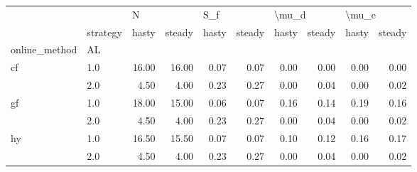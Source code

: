 \begin{tabular}{llrrrrrrrr}
\toprule
   & {} & \multicolumn{2}{l}{N} & \multicolumn{2}{l}{S\_f} & \multicolumn{2}{l}{\textbackslash mu\_d} & \multicolumn{2}{l}{\textbackslash mu\_e} \\
   & strategy & hasty & steady & hasty & steady & hasty & steady & hasty & steady \\
online\_method & AL &       &        &       &        &       &        &       &        \\
\midrule
cf & 1.0 & 16.00 &  16.00 &  0.07 &   0.07 &  0.00 &   0.00 &  0.00 &   0.00 \\
   & 2.0 &  4.50 &   4.00 &  0.23 &   0.27 &  0.00 &   0.04 &  0.00 &   0.02 \\
gf & 1.0 & 18.00 &  15.00 &  0.06 &   0.07 &  0.16 &   0.14 &  0.19 &   0.16 \\
   & 2.0 &  4.50 &   4.00 &  0.23 &   0.27 &  0.00 &   0.04 &  0.00 &   0.02 \\
hy & 1.0 & 16.50 &  15.50 &  0.07 &   0.07 &  0.10 &   0.12 &  0.16 &   0.17 \\
   & 2.0 &  4.50 &   4.00 &  0.23 &   0.27 &  0.00 &   0.04 &  0.00 &   0.02 \\
\bottomrule
\end{tabular}
